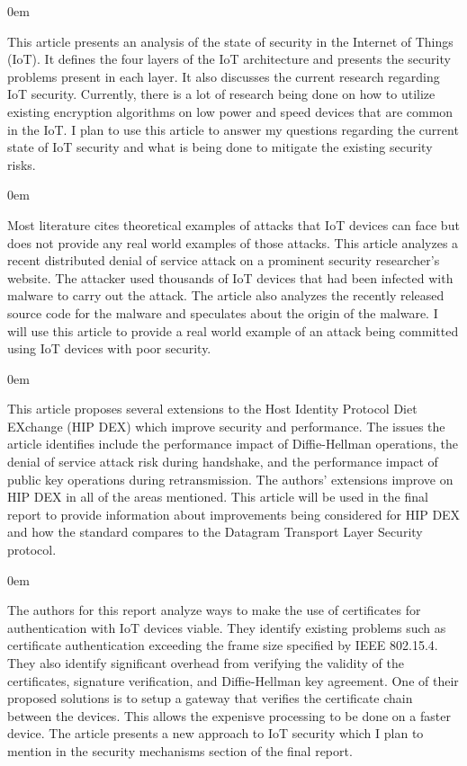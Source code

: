 \documentclass{article}
\newenvironment{annotation}{\begin{addmargin}[2.5em]{0em} \begin{flushleft}}{\end{flushleft} \end{addmargin}}
\begin{document}
\begin{annotation}
This article presents an analysis of the state of security in the Internet of Things (IoT). It defines the four layers of the IoT architecture and presents the security
problems present in each layer. It also discusses the current research regarding IoT security. Currently, there is a lot of research being done on how to utilize existing
encryption algorithms on low power and speed devices that are common in the IoT. I plan to use this article to answer my questions regarding the current state of IoT
security and what is being done to mitigate the existing security risks. 
\end{annotation}

\newpage
{}
\begin{annotation}
Most literature cites theoretical examples of attacks that IoT devices can face but does not provide any real world examples of those attacks. This article analyzes a recent distributed denial of 
service attack on a prominent security researcher's website. The attacker used thousands of IoT devices that had been infected with malware to carry out the attack. The article also analyzes the
recently released source code for the malware and speculates about the origin of the malware. I will use this article to provide a real world example of an attack being committed using IoT devices with poor security. 
\end{annotation}

\begin{annotation}
This article proposes several extensions to the Host Identity Protocol Diet EXchange (HIP DEX) which improve security and performance. The issues the article identifies include the performance impact of 
Diffie-Hellman operations, the denial of service attack risk during handshake, and the performance impact of public key operations during retransmission. The authors' extensions improve on HIP DEX in all of
the areas mentioned. This article will be used in the final report to provide information about improvements being considered for HIP DEX and how the standard compares to the Datagram Transport Layer Security protocol. 
\end{annotation}

\begin{annotation}
The authors for this report analyze ways to make the use of certificates for authentication with IoT devices viable. They identify existing problems such as certificate authentication exceeding the
frame size specified by IEEE 802.15.4. They also identify significant overhead from verifying the validity of the certificates, signature verification, and Diffie-Hellman key agreement. One of their
proposed solutions is to setup a gateway that verifies the certificate chain between the devices. This allows the expenisve processing to be done on a faster device. The article presents a new approach
to IoT security which I plan to mention in the security mechanisms section of the final report.
\end{annotation}
\end{document}
